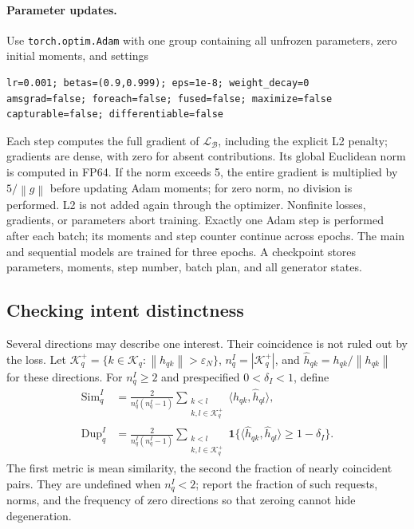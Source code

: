 \documentclass[12pt,a4paper]{article}
\newcommand{\code}[1]{{\ttfamily\small\nolinkurl{#1}}}
\newcommand{\ind}{\mathbf 1}
\newcommand{\eps}{\varepsilon}
\newcommand{\norm}[1]{\left\lVert#1\right\rVert}
\theoremstyle{plainru}
\begin{document}
\paragraph{Parameter updates.}
Use \code{torch.optim.Adam} with one group containing all unfrozen
parameters, zero initial moments, and settings
\begin{verbatim}
lr=0.001; betas=(0.9,0.999); eps=1e-8; weight_decay=0
amsgrad=false; foreach=false; fused=false; maximize=false
capturable=false; differentiable=false
\end{verbatim}
Each step computes the full gradient of $\mathcal L_{\mathcal B}$, including
the explicit L2 penalty; gradients are dense, with zero for absent contributions.
Its global Euclidean norm is computed in FP64. If the norm exceeds 5,
the entire gradient is multiplied by $5/\norm{g}$ before updating Adam moments;
for zero norm, no division is performed. L2 is not added again
through the optimizer. Nonfinite losses, gradients, or parameters abort
training. Exactly one Adam step is performed after each batch;
its moments and step counter continue across epochs.
The main and sequential models are trained for three epochs.
A checkpoint stores parameters, moments, step number, batch plan,
and all generator states.

\subsection{Checking intent distinctness}
\label{sec:modern-intent-diagnostics}

Several directions may describe one interest. Their coincidence
is not ruled out by the loss. Let
$\mathcal K_q^+=\{k\in\mathcal K_q:\norm{h_{qk}}>\eps_N\}$,
$n_q^I=|\mathcal K_q^+|$, and
$\widehat h_{qk}=h_{qk}/\norm{h_{qk}}$ for these directions.
For $n_q^I\ge2$ and prespecified $0<\delta_I<1$, define
\begin{align}\label{eq:modern-intent-duplicate}
\operatorname{Sim}_q^I
&=\frac{2}{n_q^I(n_q^I-1)}
\sum_{\substack{k<l\\k,l\in\mathcal K_q^+}}
\langle\widehat h_{qk},\widehat h_{ql}\rangle,\\
\operatorname{Dup}_q^I
&=\frac{2}{n_q^I(n_q^I-1)}
\sum_{\substack{k<l\\k,l\in\mathcal K_q^+}}
\ind\{\langle\widehat h_{qk},\widehat h_{ql}\rangle\ge1-\delta_I\}.
\nonumber
\end{align}
The first metric is mean similarity, the second the fraction of nearly coincident
pairs. They are undefined when $n_q^I<2$; report the fraction of such requests,
norms, and the frequency of zero directions so that zeroing cannot hide degeneration.
\end{document}
